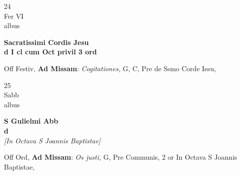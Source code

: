 \documentclass[10pt, openany]{book}
\begin{document}
        \begin{center}
            \begin{minipage}{3.5in}
                \vspace{2em}
                \begin{minipage}{0.5in}
                    {\Huge 24} \\
                    {\normalsize Fer VI} \\
                    {\normalsize albus}
                \end{minipage}
                \begin{minipage}{3.0in}
                    \textbf{ \large Sacratissimi Cordis Jesu \\
                    \textnormal{\normalsize d I cl cum Oct privil 3 ord}} \\ 
                \end{minipage}
                \begin{justify}Off Festiv, \textbf{Ad Missam}: \textit{Cogitationes,} G, C, Pre de Ssmo Corde Iesu,   
                \end{justify}
            \end{minipage}
        \end{center}
    
        \begin{center}
            \begin{minipage}{3.5in}
                \vspace{2em}
                \begin{minipage}{0.5in}
                    {\Huge 25} \\
                    {\normalsize Sabb} \\
                    {\normalsize albus}
                \end{minipage}
                \begin{minipage}{3.0in}
                    \textbf{ \large S Gulielmi Abb \\
                    \textnormal{\normalsize d}} \\ \textit{[In Octava S Joannis Baptistae]} \\ 
                \end{minipage}
                \begin{justify}Off Ord, \textbf{Ad Missam}: \textit{Os justi,} G, Pre Communis, 2 or In Octava S Joannis Baptistae,   
                \end{justify}
            \end{minipage}
        \end{center}
    
\end{document}
